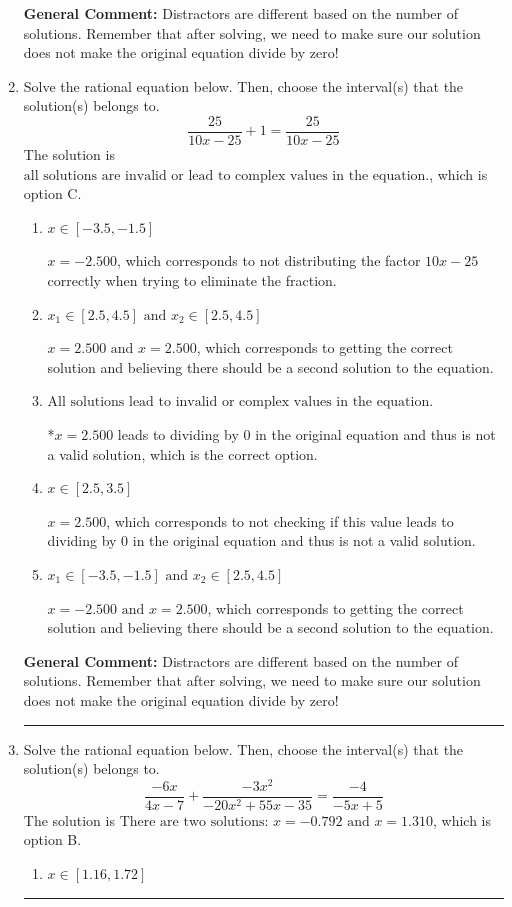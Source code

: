 \documentclass{extbook}[14pt]
\newcommand{\litem}[1]{\item #1

\rule{\textwidth}{0.4pt}}
\begin{document}
\begin{enumerate}
{\textbf{General Comment:} Distractors are different based on the number of solutions. Remember that after solving, we need to make sure our solution does not make the original equation divide by zero!
}
\litem{
Solve the rational equation below. Then, choose the interval(s) that the solution(s) belongs to.
\[ \frac{25}{10x -25} + 1 = \frac{25}{10x -25} \]The solution is \( \text{all solutions are invalid or lead to complex values in the equation.} \), which is option C.\begin{enumerate}[label=\Alph*.]
\item \( x \in [-3.5,-1.5] \)

$x = -2.500$, which corresponds to not distributing the factor $10x -25$ correctly when trying to eliminate the fraction.
\item \( x_1 \in [2.5, 4.5] \text{ and } x_2 \in [2.5,4.5] \)

$x = 2.500 \text{ and } x = 2.500$, which corresponds to getting the correct solution and believing there should be a second solution to the equation.
\item \( \text{All solutions lead to invalid or complex values in the equation.} \)

*$x = 2.500$ leads to dividing by 0 in the original equation and thus is not a valid solution, which is the correct option.
\item \( x \in [2.5,3.5] \)

$x = 2.500$, which corresponds to not checking if this value leads to dividing by 0 in the original equation and thus is not a valid solution.
\item \( x_1 \in [-3.5, -1.5] \text{ and } x_2 \in [2.5,4.5] \)

$x = -2.500 \text{ and } x = 2.500$, which corresponds to getting the correct solution and believing there should be a second solution to the equation.
\end{enumerate}

\textbf{General Comment:} Distractors are different based on the number of solutions. Remember that after solving, we need to make sure our solution does not make the original equation divide by zero!
}
\litem{
Solve the rational equation below. Then, choose the interval(s) that the solution(s) belongs to.
\[ \frac{-6x}{4x -7} + \frac{-3x^{2}}{-20x^{2} +55 x -35} = \frac{-4}{-5x + 5} \]The solution is \( \text{There are two solutions: } x = -0.792 \text{ and } x = 1.310 \), which is option B.\begin{enumerate}[label=\Alph*.]
\item \( x \in [1.16,1.72] \)



\end{enumerate}}
\end{enumerate}
\end{document}
